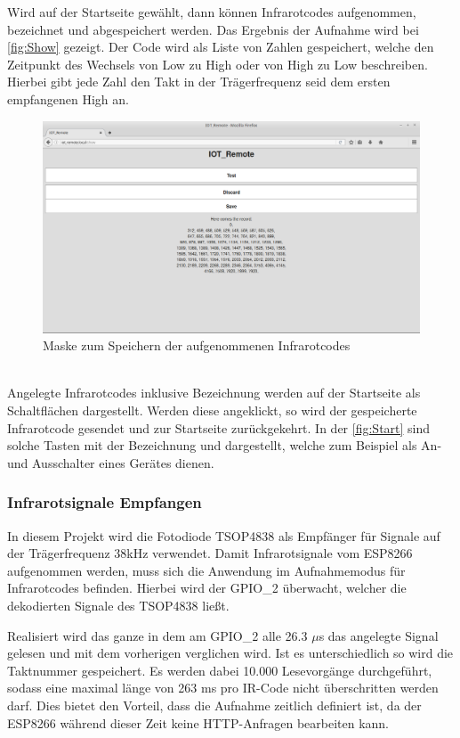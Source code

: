Wird auf der Startseite  gewählt, dann können Infrarotcodes aufgenommen, bezeichnet und abgespeichert werden.
Das Ergebnis der Aufnahme wird bei \autoref{fig:Show} gezeigt. Der Code wird als Liste von Zahlen gespeichert, welche den Zeitpunkt des Wechsels von Low zu High oder von High zu Low beschreiben. Hierbei gibt jede Zahl den Takt in der Trägerfrequenz seid dem ersten empfangenen High an.
\begin{figure}[!ht]
	\centering
	\includegraphics[scale=0.3]{Abbildungen/Show}
	\caption{Maske zum Speichern der aufgenommenen Infrarotcodes}
	\label{fig:Show}
\end{figure}\\
Angelegte Infrarotcodes inklusive Bezeichnung werden auf der Startseite als Schaltflächen dargestellt.
Werden diese angeklickt, so wird der gespeicherte Infrarotcode gesendet und zur Startseite zurückgekehrt.
In der \autoref{fig:Start} sind solche Tasten mit der Bezeichnung  und  dargestellt, welche zum Beispiel als An- und Ausschalter eines Gerätes dienen.

\subsubsection{Infrarotsignale Empfangen}
In diesem Projekt wird die Fotodiode TSOP4838 als Empfänger für Signale auf der Trägerfrequenz 38kHz verwendet.
Damit Infrarotsignale vom ESP8266 aufgenommen werden, muss sich die Anwendung im Aufnahmemodus für Infrarotcodes befinden.
Hierbei wird der \acs{GPIO}\_2 überwacht, welcher die dekodierten Signale des TSOP4838 ließt.

Realisiert wird das ganze in dem am \acs{GPIO}\_2 alle 26.3 $\mu$s das angelegte Signal gelesen und mit dem vorherigen verglichen wird. Ist es unterschiedlich so wird die Taktnummer gespeichert. Es werden dabei 10.000 Lesevorgänge durchgeführt, sodass eine maximal länge von 263 ms pro IR-Code nicht überschritten werden darf.
Dies bietet den Vorteil, dass die Aufnahme zeitlich definiert ist, da der ESP8266 während dieser Zeit keine HTTP-Anfragen bearbeiten kann.

